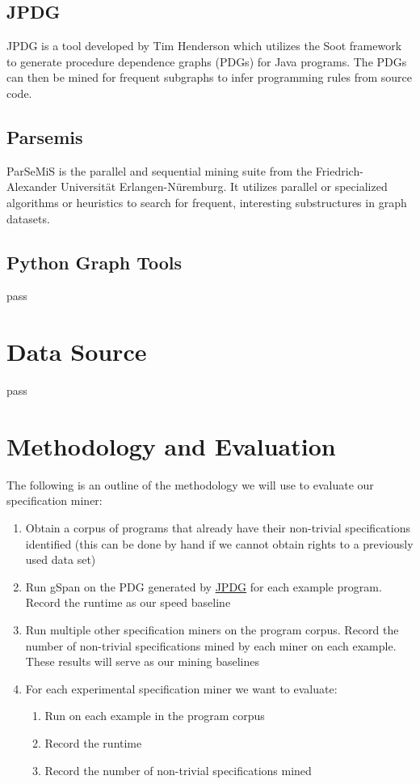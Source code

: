 \documentclass[12pt]{article}
\begin{document}
\subsection{JPDG}
\label{subsection:JPDG}
JPDG is a tool developed by Tim Henderson which utilizes the Soot framework to generate procedure dependence graphs (PDGs) for Java programs. The PDGs can then be mined for frequent subgraphs to infer programming rules from source code.

\subsection{Parsemis}
ParSeMiS is the parallel and sequential mining suite from the Friedrich-Alexander Universit{\"a}t Erlangen-N{\"u}remburg. It utilizes parallel or specialized algorithms or heuristics to search for frequent, interesting substructures in graph datasets.

\subsection{Python Graph Tools}
pass

\section{Data Source}
pass

\section{Methodology and Evaluation}
The following is an outline of the methodology we will use to evaluate our specification miner:

\begin{enumerate}
    \item Obtain a corpus of programs that already have their non-trivial specifications identified (this can be done by hand if we cannot obtain rights to a previously used data set)
    \item Run gSpan on the PDG generated by \hyperref[subsection:JPDG]{JPDG} for each example program. Record the runtime as our speed baseline
    \item Run multiple other specification miners on the program corpus. Record the number of non-trivial specifications mined by each miner on each example. These results will serve as our mining baselines
    \item For each experimental specification miner we want to evaluate:
    \begin{enumerate}
        \item Run on each example in the program corpus
        \item Record the runtime
        \item Record the number of non-trivial specifications mined
    \end{enumerate}
\end{enumerate}
\end{document}
